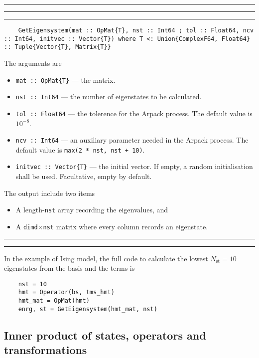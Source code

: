 \documentclass{timesjhep}
\newenvironment{block}[1]{\vspace{0.4\baselineskip}\hrule\vspace{0.10\baselineskip}\hrule\vspace{0.30\baselineskip}{\bfseries #1}\vspace{0.2\baselineskip}\hrule\vspace{0.3\baselineskip}
}{\vspace{0.2\baselineskip}\hrule\vspace{0.10\baselineskip}\hrule\vspace{0.5\baselineskip}}
\begin{document}
\begin{block}{\lstinline|GetEigensystem| --- Method}
\begin{lstlisting}
    GetEigensystem(mat :: OpMat{T}, nst :: Int64 ; tol :: Float64, ncv :: Int64, initvec :: Vector{T}) where T <: Union{ComplexF64, Float64} :: Tuple{Vector{T}, Matrix{T}}
\end{lstlisting}
The arguments are 
\begin{itemize}
    \item \lstinline|mat :: OpMat{T}| --- the matrix.
    \item \lstinline|nst :: Int64| --- the number of eigenstates to be calculated.
    \item \lstinline|tol :: Float64| --- the tolerence for the Arpack process. The default value is $10^{-8}$.
    \item \lstinline|ncv :: Int64| --- an auxiliary parameter needed in the Arpack process. The default value is \lstinline|max(2 * nst, nst + 10)|.
    \item \lstinline|initvec :: Vector{T}| --- the initial vector. If empty, a random initialisation shall be used. Facultative, empty by default.  
\end{itemize}
The output include two items
\begin{itemize}
    \item A length-\lstinline|nst| array recording the eigenvalues, and 
    \item A \lstinline|dimd|$\times$\lstinline|nst| matrix where every column records an eigenstate. 
\end{itemize}

\end{block}

In the example of Ising model, the full code to calculate the lowest $N_\mathrm{st}=10$ eigenstates from the basis and the terms is 
\begin{lstlisting}
    nst = 10
    hmt = Operator(bs, tms_hmt)
    hmt_mat = OpMat(hmt)
    enrg, st = GetEigensystem(hmt_mat, nst)
\end{lstlisting}

\subsection{Inner product of states, operators and transformations}
\label{sec:ed_inner}
\end{document}
